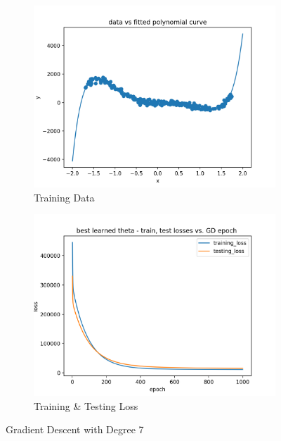 \documentclass[11pt]{article}
\begin{document}
\begin{enumerate}
\begin{figure}[!h]
  \centering
  \begin{subfigure}[b]{0.4\linewidth}
    \includegraphics[width=\linewidth]{figures/best_gd_train.png}
    \caption{Training Data}
  \end{subfigure}
  \begin{subfigure}[b]{0.4\linewidth}
    \includegraphics[width=\linewidth]{figures/best_gd_loss.png}
    \caption{Training \& Testing Loss}
  \end{subfigure}
  \caption{Gradient Descent with Degree 7}
  \label{fig:gd_7}
\end{figure}



\end{enumerate}
\end{document}
